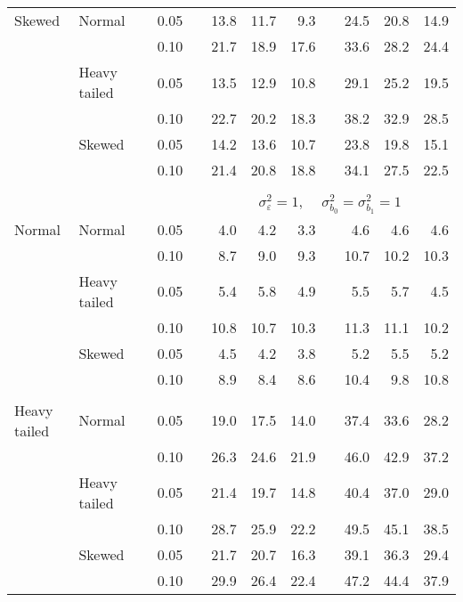 \begin{table}[ht]
\begin{scriptsize}
\begin{center}
\begin{tabular}{ll p{.1cm} c p{.1cm} rrr p{.1cm} rrr}
Skewed       & Normal       && 0.05 &&   13.8 & 11.7 & 9.3 &   & 24.5 & 20.8 & 14.9 \\ 
             &              && 0.10 &&   21.7 & 18.9 & 17.6 &   & 33.6 & 28.2 & 24.4 \\ 
             & Heavy tailed && 0.05 &&   13.5 & 12.9 & 10.8 &   & 29.1 & 25.2 & 19.5 \\ 
             &              && 0.10 &&   22.7 & 20.2 & 18.3 &   & 38.2 & 32.9 & 28.5 \\ 
             & Skewed       && 0.05 &&   14.2 & 13.6 & 10.7 &   & 23.8 & 19.8 & 15.1 \\ 
             &              && 0.10 &&   21.4 & 20.8 & 18.8 &   & 34.1 & 27.5 & 22.5 \\ 

&&&&&&&&&&&\\
& && && \multicolumn{7}{c}{$\sigma_{\varepsilon}^2 = 1$, \ \ $\sigma_{b_0}^2 = \sigma_{b_1}^2 = 1$} \\ \cline{6-12}
\rowcolor{gray!20}Normal       & Normal       && 0.05 &&   4.0 & 4.2 & 3.3 &   & 4.6 & 4.6 & 4.6 \\ 
\rowcolor{gray!20}             &              && 0.10 &&   8.7 & 9.0 & 9.3 &   & 10.7 & 10.2 & 10.3 \\ 
\rowcolor{gray!20}             & Heavy tailed && 0.05 &&   5.4 & 5.8 & 4.9 &   & 5.5 & 5.7 & 4.5 \\ 
\rowcolor{gray!20}             &              && 0.10 &&   10.8 & 10.7 & 10.3 &   & 11.3 & 11.1 & 10.2 \\ 
\rowcolor{gray!20}             & Skewed       && 0.05 &&   4.5 & 4.2 & 3.8 &   & 5.2 & 5.5 & 5.2 \\ 
\rowcolor{gray!20}             &              && 0.10 &&   8.9 & 8.4 & 8.6 &   & 10.4 & 9.8 & 10.8 \\ 
&&&&&&&&&&&\\
Heavy tailed & Normal       && 0.05 &&   19.0 & 17.5 & 14.0 &   & 37.4 & 33.6 & 28.2 \\ 
             &              && 0.10 &&   26.3 & 24.6 & 21.9 &   & 46.0 & 42.9 & 37.2 \\ 
             & Heavy tailed && 0.05 &&   21.4 & 19.7 & 14.8 &   & 40.4 & 37.0 & 29.0 \\ 
             &              && 0.10 &&   28.7 & 25.9 & 22.2 &   & 49.5 & 45.1 & 38.5 \\ 
             & Skewed       && 0.05 &&   21.7 & 20.7 & 16.3 &   & 39.1 & 36.3 & 29.4 \\ 
             &              && 0.10 &&   29.9 & 26.4 & 22.4 &   & 47.2 & 44.4 & 37.9 \\ 

\end{tabular}
\end{center}
\end{scriptsize}
\end{table}
